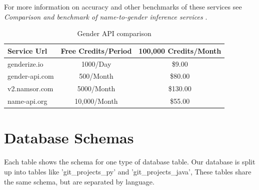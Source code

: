 \documentclass[12pt]{article}
\begin{document}
\begin{sloppypar} For more information on accuracy and other benchmarks of these services see \textit{Comparison and benchmark of name-to-gender inference services} \cite{Santamaria2018}. \end{sloppypar}

\begin{table}[h!]
    \begin{center}
        \caption{Gender API comparison}
        \label{tab:gen_apis}
        \begin{tabular}{|l|c|c|}
            \hline
            \textbf{Service Url} & \textbf{Free Credits/Period} & \textbf{100,000 Credits/Month}\\
            \hline
            genderize.io & 1000/Day & \$9.00 \\
            gender-api.com & 500/Month & \$80.00 \\
            v2.namsor.com & 5000/Month & \$130.00 \\
            name-api.org & 10,000/Month & \$55.00 \\
            \hline
        \end{tabular}
    \end{center}
\end{table}

\newpage
\section{Database Schemas}
Each table shows the schema for one type of database table. Our database is split up into tables like 'git{\_}projects{\_}py' and 'git{\_}projects{\_}java', These tables share the same schema, but are separated by language.
\end{document}
